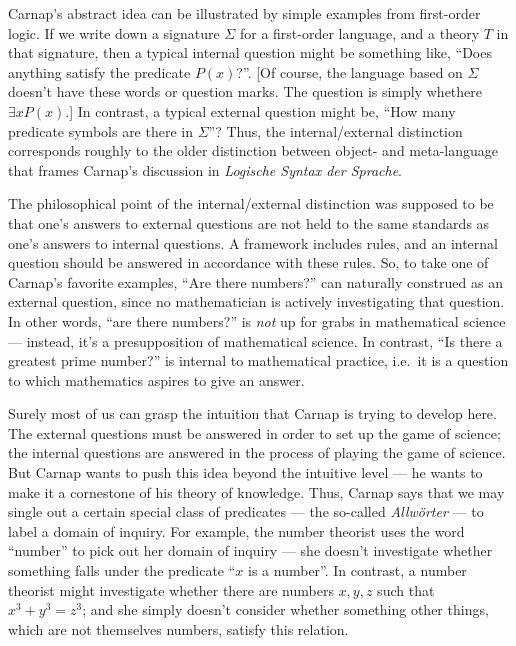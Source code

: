 Carnap's abstract idea can be illustrated by simple examples from
first-order logic.  If we write down a signature $\Sigma$ for a
first-order language, and a theory $T$ in that signature, then a
typical internal question might be something like, ``Does anything
satisfy the predicate $P(x)$?''.  [Of course, the language based on
$\Sigma$ doesn't have these words or question marks.  The question is
simply whethere $\exists xP(x)$.]  In contrast, a typical external
question might be, ``How many predicate symbols are there in
$\Sigma$''?  Thus, the internal/external distinction corresponds
roughly to the older distinction between object- and meta-language
that frames Carnap's discussion in {\it Logische Syntax der Sprache}.

The philosophical point of the internal/external distinction was
supposed to be that one's answers to external questions are not held
to the same standards as one's answers to internal questions.  A
framework includes rules, and an internal question should be answered
in accordance with these rules.  So, to take one of Carnap's favorite
examples, ``Are there numbers?''  can naturally construed as an
external question, since no mathematician is actively investigating
that question.  In other words, ``are there numbers?'' is {\it not} up
for grabs in mathematical science --- instead, it's a presupposition
of mathematical science.  In contrast, ``Is there a greatest prime
number?'' is internal to mathematical practice, i.e.\ it is a question
to which mathematics aspires to give an answer.

Surely most of us can grasp the intuition that Carnap is trying to
develop here.  The external questions must be answered in order to set
up the game of science; the internal questions are answered in the
process of playing the game of science.  But Carnap wants to push this
idea beyond the intuitive level --- he wants to make it a cornestone
of his theory of knowledge.  Thus, Carnap says that we may single out
a certain special class of predicates --- the so-called {\it
  Allw\"orter} --- to label a domain of inquiry.  For example, the
number theorist uses the word ``number'' to pick out her domain of
inquiry --- she doesn't investigate whether something falls under the
predicate ``$x$ is a number''.  In contrast, a number theorist might
investigate whether there are numbers $x,y,z$ such that $x^3+y^3=z^3$;
and she simply doesn't consider whether something other things, which
are not themselves numbers, satisfy this relation.

